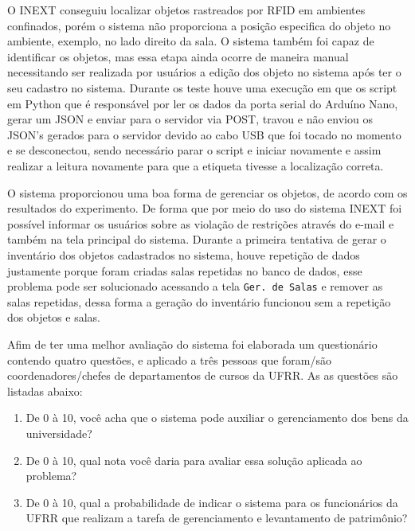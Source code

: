 \par
O INEXT conseguiu localizar objetos rastreados por RFID em ambientes confinados, porém o sistema não proporciona a posição especifica do objeto no ambiente, exemplo, no lado direito da sala. O sistema também foi capaz de identificar os objetos, mas essa etapa ainda ocorre de maneira manual necessitando ser realizada por usuários a edição dos objeto no sistema após ter o seu cadastro no sistema. %
Durante os teste houve uma execução em que os script em Python que é responsável por ler os dados da porta serial do Arduíno Nano, gerar um JSON e enviar para o servidor via POST, %
travou e não enviou os JSON's gerados para o servidor devido ao cabo USB que foi tocado no momento e se desconectou, sendo necessário parar o script e iniciar novamente e assim realizar a leitura novamente para que a etiqueta tivesse a localização correta.%

\par
O sistema proporcionou uma boa forma de gerenciar os objetos, de acordo com os resultados do experimento. De forma que por meio do uso do sistema INEXT foi possível informar os usuários sobre as violação de restrições através do e-mail e também na tela principal do sistema. 
% 
Durante a primeira tentativa de gerar o inventário dos objetos cadastrados no sistema, houve repetição de dados justamente porque foram criadas salas repetidas no banco de dados, esse problema pode ser solucionado acessando a tela \texttt{Ger. de Salas} e remover as salas repetidas, dessa forma a geração do inventário funcionou sem a repetição dos objetos e salas. %
\par
Afim de ter uma melhor avaliação do sistema foi elaborada um questionário contendo quatro questões, e aplicado a três pessoas que foram/são coordenadores/chefes de departamentos de cursos da UFRR. As as questões são listadas abaixo:
\begin{enumerate}
    \item De 0 à 10, você acha que o sistema pode auxiliar o gerenciamento dos bens da universidade?
    \item De 0 à 10, qual nota você daria para avaliar essa solução aplicada ao problema?
    \item De 0 à 10, qual a probabilidade de indicar o sistema para os funcionários da UFRR que realizam a tarefa de gerenciamento e levantamento de patrimônio?
\end{enumerate}

